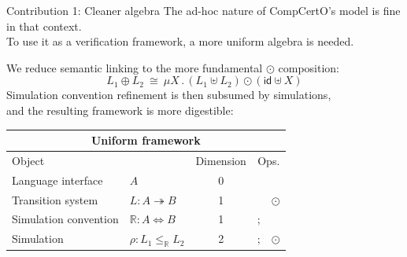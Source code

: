\documentclass[aspectratio=1610,12pt]{beamer}
\begin{document}
\begin{frame}[fragile]{Contribution 1: Cleaner algebra} %
  The ad-hoc nature of CompCertO's model is fine in that context. \\
  To use it as a verification framework, a more uniform algebra is needed.

  \vfill
  We reduce semantic linking to the more fundamental $\odot$ composition:
  \[
    L_1 \oplus L_2 \:\cong\:
      \mu X \mathbin. (L_1 \uplus L_2) \odot (\mathsf{id} \uplus X)
  \]
  Simulation convention refinement is then subsumed by simulations, \\
  and the resulting framework is more digestible:
  \begin{center}
    \begin{tabular}{llcll}
      \toprule
      \multicolumn{5}{c}{\textbf{Uniform framework}} \\
      \midrule
      Object & & Dimension & \multicolumn{2}{c}{Ops.} \\
      \midrule
      Language interface & $A$ & 0 & \\
      Transition system & $L : A \twoheadrightarrow B$ & 1 & & $\odot$ \\
      Simulation convention & $\mathbb{R} : A \Leftrightarrow B$ & 1 & $\mathbin;$ \\
      Simulation & $\rho : L_1 \le_\mathbb{R} L_2$ & 2 & $\mathbin;$ & $\odot$ \\
      \bottomrule
    \end{tabular}
  \end{center}
\end{frame}
\end{document}
